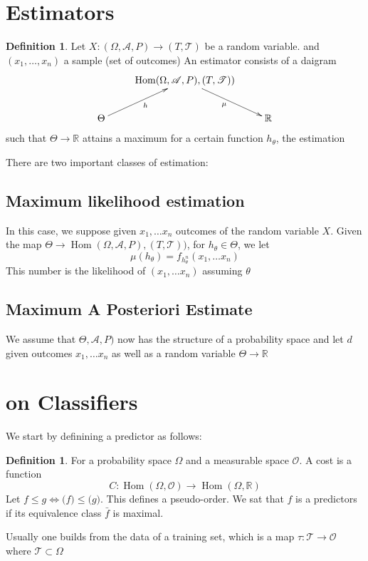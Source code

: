 \documentclass{book}
\theoremstyle{plain}
\theoremstyle{definition}
\newtheorem{definition}[corollary]{Definition}
\renewcommand{\d}[1]{\mathbb{#1}}
\DeclareMathOperator{\Hom}{Hom}
\newcommand{\mor}{\longrightarrow}
\renewcommand{\r}[1]{\mathcal{#1}}
\renewcommand{\c}[1]{\mathcal{#1}}
\begin{document}
\section{Estimators}

\begin{definition}
Let $X:(\Omega,\r{A},P)\mor (T,\r{T})$ be a random variable. and $(x_1,\ldots , x_n)$ a sample (set of outcomes) An estimator consists of a daigram
\begin{displaymath}
\xymatrix{
&  \Hom(\Omega,\r{A},P), (T,\r{T}))\ar[dr]_\mu\\
\Theta\ar[ur]_h & & \d{R}
}	
\end{displaymath}
such that $\Theta\mor \d{R}$ attains a maximum for a certain function $h_\theta$, the estimation
\end{definition}


There are two important classes of estimation:

\subsection{Maximum likelihood estimation}
 In this case, we suppose given $x_1,\dots x_n$ outcomes of the random variable $X$. Given the map $\Theta \mor \Hom(\Omega,\r{A},P), (T,\r{T}))$, for $h_\theta \in \Theta$, we let \[\mu(h_\theta)=f_{h_\theta^n}(x_1,\ldots x_n)\]
 This number is the likelihood of $(x_1,\ldots x_n)$ assuming $\theta$
 
 \subsection{Maximum A Posteriori Estimate}
 We assume that $\Theta,\r{A},P)$ now has the structure of a probability space and let $ d$ given outcomes $x_1,\ldots x_n$ as well as a random variable $\Theta\mor \d{R}$
\section{on Classifiers}

We start by definining a predictor as follows:
\begin{definition}
For a probability space $\Omega$ and a measurable space $\r{O}$. A cost is a function
\[
C:\Hom(\Omega,\r{O}) \mor \Hom(\Omega,\d{R})
\]	
Let $f\le g \iff \c(f)\le \c(g)$. This defines a pseudo-order. We sat that $f$ is a predictors if its equivalence class $\bar{f}$ is maximal.
\end{definition}

Usually one builds from the data of a training set, which is a map $\tau: \r{T}\mor \r{O}$ where $\r{T}\subset \Omega$
\end{document}
